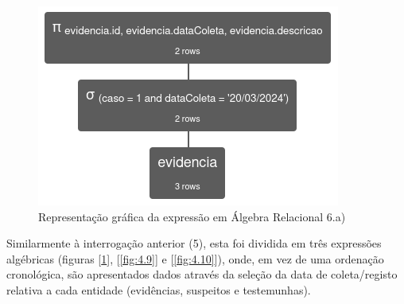 \documentclass[a4paper,12pt]{scrreprt}
\begin{document}
\begin{figure}[!ht]
    \centering
    \includegraphics[scale=0.9]{images/relax/6-a.png}
    \caption{Representação gráfica da expressão em Álgebra Relacional 6.a)}
    \label{fig:4.8}
\end{figure}

Similarmente à interrogação anterior (5), esta foi dividida em três expressões algébricas (figuras [\ref{fig:4.8}], [\ref{fig:4.9}] e [\ref{fig:4.10}]), onde, em vez de uma ordenação cronológica, são apresentados dados através da seleção da data de coleta/registo relativa a cada entidade (evidências, suspeitos e testemunhas).

\end{document}
